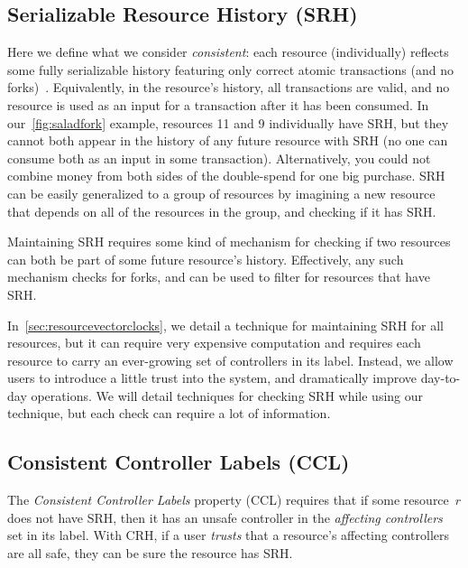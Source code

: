 \documentclass[a4paper,USenglish,cleveref, autoref, thm-restate, anonymous]{lipics-v2021}
\begin{document}
\subsection{Serializable Resource History (SRH)}
Here we define what we consider \emph{consistent}: each resource (individually) reflects some fully serializable history featuring only correct atomic transactions (and no forks)~\cite{serializability}. 
Equivalently, in the resource's history, all transactions are valid, and no resource is used as an input for a transaction after it has been consumed. 
In our~\cref{fig:saladfork} example, resources 11 and 9 individually have SRH, but they cannot both appear in the history of any future resource with SRH (no one can consume both as an input in some transaction).
Alternatively, you could not combine money from both sides of the double-spend for one big purchase.
SRH can be easily generalized to a group of resources by imagining a new resource that depends on all of the resources in the group, and checking if it has SRH.

Maintaining SRH requires some kind of mechanism for checking if two resources can both be part of some future resource's history. 
Effectively, any such mechanism checks for forks, and can be used to filter for resources that have SRH.


In~\cref{sec:resourcevectorclocks}, we detail a technique for maintaining SRH for all resources, but it can require very expensive computation and requires each resource to carry an ever-growing set of controllers in its label. 
Instead, we allow users to introduce a little trust into the system, and dramatically improve day-to-day operations.
We will detail techniques for checking SRH while using our technique, but each check can require a lot of information.

\subsection{Consistent Controller Labels (CCL)}
The \emph{Consistent Controller Labels}  property (CCL) requires that if some resource~$r$ does not have SRH, then it has an unsafe controller in the \textit{affecting controllers} set in its label.
With CRH, if a user \textit{trusts} that a resource's affecting controllers are all safe, they can be sure the resource has SRH. 
\end{document}
